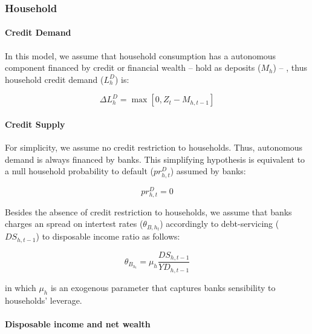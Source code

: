 \documentclass{SelfArx}
\begin{document}
\subsubsection{Household}
\label{sec:org6850da4}

\paragraph*{Credit Demand}
\label{sec:org6f142e0}

In this model, we assume that household consumption has a autonomous component financed by credit or financial wealth -- hold as deposits (\(M_{h}\)) -- , thus household credit demand (\(L^{D}_{h}\)) is:

\begin{latex}
\begin{equation}
\Delta L^{D}_{h} = \max [0, Z_{t} - M_{h,t-1}]
\end{equation}
\end{latex}

\paragraph*{Credit Supply}
\label{sec:org212d069}

For simplicity, we assume no credit restriction to households.
Thus, autonomous demand is always financed by banks.
This simplifying hypothesis is equivalent to a null household probability to default (\(pr^{D}_{h,t}\)) assumed by banks:

\begin{latex}
\begin{equation}
pr^{D}_{h,t} = 0
\end{equation}
\end{latex}
Besides the absence of credit restriction to households, we assume that banks charges an spread on intertest rates (\(\theta_{B,h_{t}}\)) accordingly to debt-servicing (\(DS_{h,t-1}\)) to disposable income ratio as follows:

\begin{latex}
\begin{equation}
\theta_{B_{h_{t}}} = \mu_{h}\frac{DS_{h,t-1}}{YD_{h,t-1}}
\end{equation}
\end{latex}
in which \(\mu_{h}\) is an exogenous parameter that captures banks sensibility to households' leverage.

\paragraph*{Disposable income and net wealth}
\label{sec:org0982db3}
\end{document}
